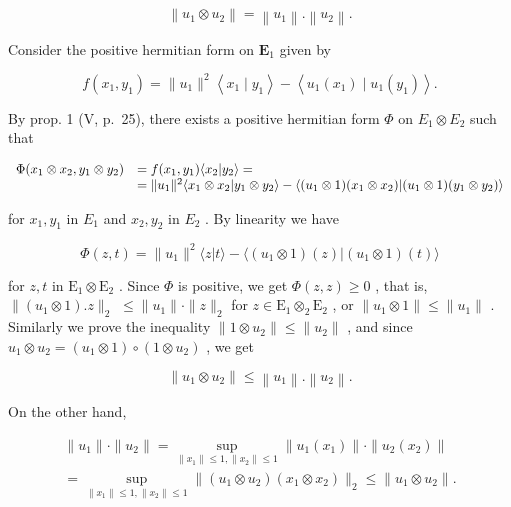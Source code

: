 \[
\left\| u _ {1} \otimes u _ {2} \right\| = \left\| u _ {1} \right\|. \left\| u _ {2} \right\|.
\]

Consider the positive hermitian form on \(\mathbf{E}_1\) given by

\[
f \left(x _ {1}, y _ {1}\right) = \| u _ {1} \| ^ {2} \left\langle x _ {1} \mid y _ {1} \right\rangle - \left\langle u _ {1} \left(x _ {1}\right) \mid u _ {1} \left(y _ {1}\right) \right\rangle .
\]

By prop. 1 (V, p.~25), there exists a positive hermitian form \(\Phi\) on \(E_1 \otimes E_2\) such that

\[
\begin{array}{r l} \Phi (x _ {1} \otimes x _ {2}, y _ {1} \otimes y _ {2}) & = f (x _ {1}, y _ {1}) \langle x _ {2} | y _ {2} \rangle = \\ & = \| u _ {1} \| ^ {2} \langle x _ {1} \otimes x _ {2} | y _ {1} \otimes y _ {2} \rangle - \langle (u _ {1} \otimes 1) (x _ {1} \otimes x _ {2}) | (u _ {1} \otimes 1) (y _ {1} \otimes y _ {2}) \rangle \end{array}
\]

for \(x_{1}, y_{1}\) in \(E_{1}\) and \(x_{2}, y_{2}\) in \(E_{2}\) . By linearity we have

\[
\Phi (z, t) = \| u _ {1} \| ^ {2} \langle z | t \rangle - \langle (u _ {1} \otimes 1) (z) | (u _ {1} \otimes 1) (t) \rangle
\]

for \(z, t\) in \(\mathrm{E}_1 \otimes \mathrm{E}_2\) . Since \(\Phi\) is positive, we get \(\Phi(z, z) \geqslant 0\) , that is, \(\| (u_1 \otimes 1).z \|_2\) \(\leqslant \| u_1\| \cdot \| z\| _2\) for \(z\in \mathrm{E}_1\otimes_2\mathrm{E}_2\) , or \(\| u_1\otimes 1\| \leqslant \| u_1\|\) . Similarly we prove the inequality \(\| 1\otimes u_2\| \leqslant \| u_2\|\) , and since \(u_{1}\otimes u_{2} = (u_{1}\otimes 1)\circ (1\otimes u_{2})\) , we get

\[
\left\| u _ {1} \otimes u _ {2} \right\| \leqslant \left\| u _ {1} \right\|. \left\| u _ {2} \right\|.
\]

On the other hand,

\[
\begin{array}{l} \| u _ {1} \| \cdot \| u _ {2} \| = \sup _ {\| x _ {1} \| \leqslant 1, \| x _ {2} \| \leqslant 1} \| u _ {1} (x _ {1}) \| \cdot \| u _ {2} (x _ {2}) \| \\ = \sup _ {\| x _ {1} \| \leqslant 1, \| x _ {2} \| \leqslant 1} \| (u _ {1} \otimes u _ {2}) (x _ {1} \otimes x _ {2}) \| _ {2} \leqslant \| u _ {1} \otimes u _ {2} \|. \end{array}
\]

